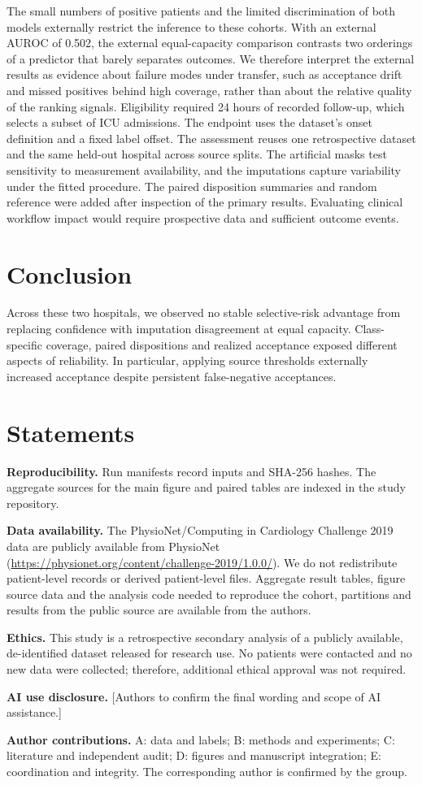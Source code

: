 The small numbers of positive patients and the limited discrimination of both models externally restrict the inference to these cohorts. With an external AUROC of 0.502, the external equal-capacity comparison contrasts two orderings of a predictor that barely separates outcomes. We therefore interpret the external results as evidence about failure modes under transfer, such as acceptance drift and missed positives behind high coverage, rather than about the relative quality of the ranking signals. Eligibility required 24 hours of recorded follow-up, which selects a subset of ICU admissions. The endpoint uses the dataset's onset definition and a fixed label offset. The assessment reuses one retrospective dataset and the same held-out hospital across source splits. The artificial masks test sensitivity to measurement availability, and the imputations capture variability under the fitted procedure. The paired disposition summaries and random reference were added after inspection of the primary results. Evaluating clinical workflow impact would require prospective data and sufficient outcome events.

\section{Conclusion}

Across these two hospitals, we observed no stable selective-risk advantage from replacing confidence with imputation disagreement at equal capacity. Class-specific coverage, paired dispositions and realized acceptance exposed different aspects of reliability. In particular, applying source thresholds externally increased acceptance despite persistent false-negative acceptances.

\section*{Statements}

\textbf{Reproducibility.} Run manifests record inputs and SHA-256 hashes. The aggregate sources for the main figure and paired tables are indexed in the study repository.

\textbf{Data availability.} The PhysioNet/Computing in Cardiology Challenge 2019 data are publicly available from PhysioNet (\url{https://physionet.org/content/challenge-2019/1.0.0/}). We do not redistribute patient-level records or derived patient-level files. Aggregate result tables, figure source data and the analysis code needed to reproduce the cohort, partitions and results from the public source are available from the authors.

\textbf{Ethics.} This study is a retrospective secondary analysis of a publicly available, de-identified dataset released for research use. No patients were contacted and no new data were collected; therefore, additional ethical approval was not required.

\textbf{AI use disclosure.} [Authors to confirm the final wording and scope of AI assistance.]

\textbf{Author contributions.} A: data and labels; B: methods and experiments; C: literature and independent audit; D: figures and manuscript integration; E: coordination and integrity. The corresponding author is confirmed by the group.
